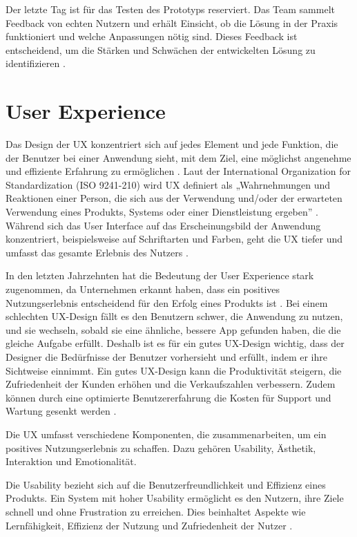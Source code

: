 Der letzte Tag ist für das Testen des Prototyps reserviert. Das Team sammelt Feedback von echten Nutzern und erhält Einsicht, ob die Lösung in der Praxis funktioniert und welche Anpassungen nötig sind. Dieses Feedback ist entscheidend, um die Stärken und Schwächen der entwickelten Lösung zu identifizieren \cite[S.22 ff.]{Design_Sprint}.

\section{User Experience}
Das Design der \ac{UX} konzentriert sich auf jedes Element und jede Funktion, die der Benutzer bei einer Anwendung sieht, mit dem Ziel, eine möglichst angenehme und effiziente Erfahrung zu ermöglichen \cite[S.12]{Bordegoni}. 
Laut der International Organization for Standardization (ISO 9241-210) wird UX definiert als „Wahrnehmungen und Reaktionen einer Person, die sich aus der Verwendung und/oder der erwarteten Verwendung eines Produkts, Systems oder einer Dienstleistung ergeben” \cite{iso}. 
Während sich das User Interface auf das Erscheinungsbild der Anwendung konzentriert, beispielsweise auf Schriftarten und Farben, geht die UX tiefer und umfasst das gesamte Erlebnis des Nutzers \cite[S.8]{Canziba}.

In den letzten Jahrzehnten hat die Bedeutung der User Experience stark zugenommen, da Unternehmen erkannt haben, dass ein positives Nutzungserlebnis entscheidend für den Erfolg eines Produkts ist \cite{ux_article}. 
Bei einem schlechten UX-Design fällt es den Benutzern schwer, die Anwendung zu nutzen, und sie wechseln, sobald sie eine ähnliche, bessere App gefunden haben, die die gleiche Aufgabe erfüllt. 
Deshalb ist es für ein gutes UX-Design wichtig, dass der Designer die Bedürfnisse der Benutzer vorhersieht und erfüllt, indem er ihre Sichtweise einnimmt. Ein gutes UX-Design kann die Produktivität steigern, die Zufriedenheit der Kunden erhöhen und die Verkaufszahlen verbessern. 
Zudem können durch eine optimierte Benutzererfahrung die Kosten für Support und Wartung gesenkt werden \cite[S.8 ff.]{Canziba}.

Die UX umfasst verschiedene Komponenten, die zusammenarbeiten, um ein positives Nutzungserlebnis zu schaffen. Dazu gehören Usability, Ästhetik, Interaktion und Emotionalität.

Die Usability bezieht sich auf die Benutzerfreundlichkeit und Effizienz eines Produkts. 
Ein System mit hoher Usability ermöglicht es den Nutzern, ihre Ziele schnell und ohne Frustration zu erreichen. 
Dies beinhaltet Aspekte wie Lernfähigkeit, Effizienz der Nutzung und Zufriedenheit der Nutzer \cite[S.23 ff.]{Nielsen}.

